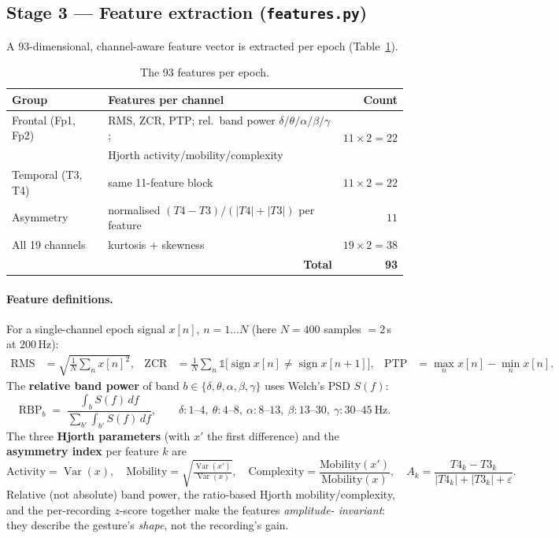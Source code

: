 \documentclass[11pt,a4paper]{article}
\newcommand{\code}[1]{\texttt{#1}}
\begin{document}
\subsection{Stage 3 --- Feature extraction (\code{features.py})}
A $93$-dimensional, channel-aware feature vector is extracted per epoch
(Table~\ref{tab:features}).

\begin{table}[h]
\centering
\caption{The 93 features per epoch.}
\label{tab:features}
\small
\begin{tabular}{@{}llr@{}}
\toprule
Group & Features per channel & Count \\
\midrule
Frontal (Fp1, Fp2) & RMS, ZCR, PTP; rel.\ band power $\delta/\theta/\alpha/\beta/\gamma$; & \multirow{2}{*}{$11\times2=22$}\\
                   & Hjorth activity/mobility/complexity & \\
Temporal (T3, T4)  & same 11-feature block & $11\times2=22$ \\
Asymmetry          & normalised $(T4-T3)/(|T4|+|T3|)$ per feature & $11$ \\
All 19 channels    & kurtosis $+$ skewness & $19\times2=38$ \\
\midrule
\multicolumn{2}{r}{\textbf{Total}} & \textbf{93} \\
\bottomrule
\end{tabular}
\end{table}

\paragraph{Feature definitions.}
For a single-channel epoch signal $x[n]$, $n=1\dots N$ (here $N=400$ samples
$=2$\,s at $200$\,Hz):
\begin{align*}
\text{RMS} &= \sqrt{\tfrac1N\textstyle\sum_n x[n]^2}, &
\text{ZCR} &= \tfrac1N\textstyle\sum_n \mathbb{1}\!\big[\operatorname{sign}x[n]\neq\operatorname{sign}x[n{+}1]\big], &
\text{PTP} &= \max_n x[n]-\min_n x[n].
\end{align*}
The \textbf{relative band power} of band $b\in\{\delta,\theta,\alpha,\beta,\gamma\}$
uses Welch's PSD $S(f)$:
\[
\mathrm{RBP}_b \;=\; \frac{\int_{b}S(f)\,df}{\sum_{b'}\int_{b'}S(f)\,df},
\qquad
\delta{:}1\text{--}4,\ \theta{:}4\text{--}8,\ \alpha{:}8\text{--}13,\
\beta{:}13\text{--}30,\ \gamma{:}30\text{--}45\ \text{Hz}.
\]
The three \textbf{Hjorth parameters} (with $x'$ the first difference) and the
\textbf{asymmetry index} per feature $k$ are
\[
\text{Activity}=\operatorname{Var}(x),\quad
\text{Mobility}=\sqrt{\tfrac{\operatorname{Var}(x')}{\operatorname{Var}(x)}},\quad
\text{Complexity}=\frac{\text{Mobility}(x')}{\text{Mobility}(x)},\quad
A_k=\frac{T4_k-T3_k}{|T4_k|+|T3_k|+\varepsilon}.
\]
Relative (not absolute) band power, the ratio-based Hjorth mobility/complexity,
and the per-recording $z$-score together make the features \emph{amplitude-%
invariant}: they describe the gesture's \emph{shape}, not the recording's gain.
\end{document}
